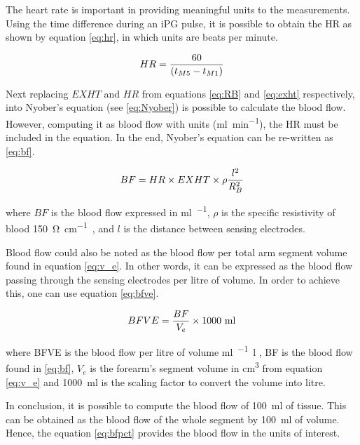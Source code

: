 The heart rate is important in providing meaningful units to the measurements. Using the time difference during an iPG pulse, it is possible to obtain the HR as shown by equation \ref{eq:hr}, in which units are beats per minute.

\begin{align}
	\label{eq:hr}
	HR = \frac{60}{(t_{M5}-t_{M1})}  \tagaddtext{[\si{bpm}]}
\end{align}

Next replacing  $EXHT$ and $HR$ from equations \ref{eq:RB} and \ref{eq:exht} respectively, into Nyober's equation (see \ref{eq:Nyober}) is possible to calculate the blood flow. However, computing it as blood flow with  units (\si{\milli\litre\per\minute}), the HR must be included in the equation. In the end, Nyober's equation can be re-written as \ref{eq:bf}. 

\begin{align}
	\label{eq:bf}
	BF = HR \times EXHT \times \rho \frac{l^2}{R_B^2} \tagaddtext{[\si{\ml\per\min}]}
\end{align}

where $BF$ is the blood flow expressed in \si{\milli\litre\per\min}, $\rho$ is the specific resistivity of blood \SI{150}{\ohm\per\cm}~\cite{mohapatra1981non, nyober1950electrical}, and $l$ is the distance between sensing electrodes.

Blood flow could also be noted as the blood flow per total arm segment volume found in equation \ref{eq:v_e}.  In other words, it can be expressed as the blood flow passing through the sensing electrodes per litre of volume. In order to achieve this, one can use equation \ref{eq:bfve}.

\begin{align}
	\label{eq:bfve}
	BFVE = \frac{BF}{V_e} \times \text{1000 ml} \tagaddtext{[\si{\ml\per\min.\litre}]}
\end{align}

where BFVE is the blood flow per litre of volume \si{\ml\per\min.\litre} , BF is the blood flow found in \ref{eq:bf}, $V_e$ is the forearm's segment volume in \si{\cubic\cm} from equation \ref{eq:v_e} and \SI{1000}{ml} is the scaling factor to convert the volume into litre.

In conclusion, it is possible to compute the blood flow of \SI{100}{\milli\litre} of tissue. This can be obtained as the blood flow of the whole segment by \SI{100}{\milli\litre} of volume. Hence, the equation \ref{eq:bfpct} provides the blood flow in the units of interest. 

